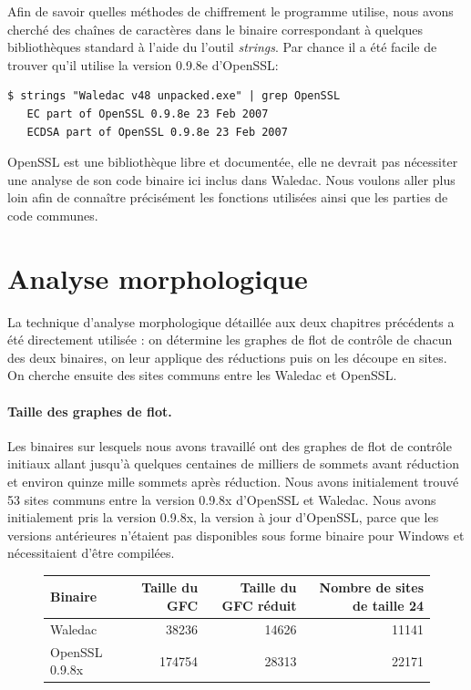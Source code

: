 Afin de savoir quelles méthodes de chiffrement le programme utilise, nous avons cherché des chaînes de caractères dans le binaire correspondant à quelques bibliothèques standard à l'aide du l'outil \emph{strings}.
Par chance il a été facile de trouver qu'il utilise la version 0.9.8e d'OpenSSL:
\begin{verbatim}
$ strings "Waledac v48 unpacked.exe" | grep OpenSSL
   EC part of OpenSSL 0.9.8e 23 Feb 2007
   ECDSA part of OpenSSL 0.9.8e 23 Feb 2007
\end{verbatim}

OpenSSL \cite{openssl} est une bibliothèque libre et documentée, elle ne devrait pas nécessiter une analyse de son code binaire ici inclus dans Waledac. Nous voulons aller plus loin afin de connaître précisément les fonctions utilisées ainsi que les parties de code communes.

\section{Analyse morphologique}
La technique d'analyse morphologique détaillée aux deux chapitres précédents a été directement utilisée : on détermine les graphes de flot de contrôle de chacun des deux binaires, on leur applique des réductions puis on les découpe en sites.
On cherche ensuite des sites communs entre les Waledac et OpenSSL.

\paragraph{Taille des graphes de flot.}
Les binaires sur lesquels nous avons travaillé ont des graphes de flot de contrôle initiaux allant jusqu'à quelques centaines de milliers de sommets avant réduction et environ quinze mille sommets après réduction. Nous avons initialement trouvé 53 sites communs entre la version 0.9.8x d'OpenSSL et Waledac.
Nous avons initialement pris la version 0.9.8x, la version à jour d'OpenSSL, parce que les versions antérieures n'étaient pas disponibles sous forme binaire pour Windows et nécessitaient d'être compilées.

\begin{figure}[h]
\begin{center}
\begin{tabular}{|l|r|r|r|}
\hline
 Binaire & Taille du GFC & Taille du GFC réduit & Nombre de sites de taille 24 	\\
\hline
 Waledac &  38236 & 14626 & 11141					  	\\
\hline
 OpenSSL 0.9.8x  & 174754 & 28313 & 22171				  	\\
\hline
\end{tabular}
\end{center}
\end{figure}

